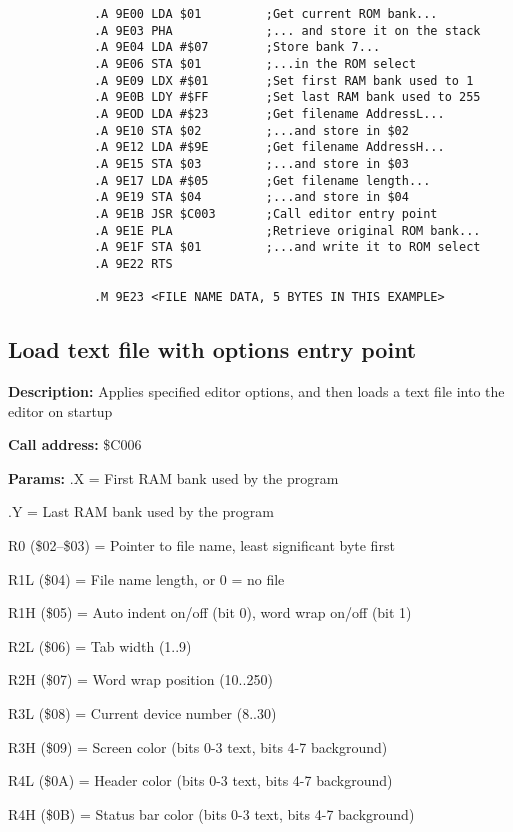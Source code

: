 \documentclass{article}
\begin{document}
        \begin{verbatim}
            .A 9E00 LDA $01         ;Get current ROM bank...
            .A 9E03 PHA             ;... and store it on the stack
            .A 9E04 LDA #$07        ;Store bank 7...
            .A 9E06 STA $01         ;...in the ROM select
            .A 9E09 LDX #$01        ;Set first RAM bank used to 1
            .A 9E0B LDY #$FF        ;Set last RAM bank used to 255
            .A 9EOD LDA #$23        ;Get filename AddressL...
            .A 9E10 STA $02         ;...and store in $02
            .A 9E12 LDA #$9E        ;Get filename AddressH...
            .A 9E15 STA $03         ;...and store in $03
            .A 9E17 LDA #$05        ;Get filename length...
            .A 9E19 STA $04         ;...and store in $04
            .A 9E1B JSR $C003       ;Call editor entry point
            .A 9E1E PLA             ;Retrieve original ROM bank...
            .A 9E1F STA $01         ;...and write it to ROM select
            .A 9E22 RTS

            .M 9E23 <FILE NAME DATA, 5 BYTES IN THIS EXAMPLE>
        \end{verbatim}    

\subsection{Load text file with options entry point}

        \begin{hangparas}{3cm}{1}

            \textbf{Description:} \tabto{3cm} Applies specified editor options, and then loads a text file into the editor on startup

            \textbf{Call address:} \tabto{3cm}\$C006

            \textbf{Params:} \tabto{3cm}.X = First RAM bank used by the program
        
            \tabto{3cm} .Y = Last RAM bank used by the program

            \tabto{3cm} R0 (\$02--\$03) = Pointer to file name, least significant byte first

            \tabto{3cm} R1L (\$04) = File name length, or 0 = no file

            \tabto{3cm} R1H (\$05) = Auto indent on/off (bit 0), word wrap on/off (bit 1)

            \tabto{3cm} R2L (\$06) = Tab width (1..9)

            \tabto{3cm} R2H (\$07) = Word wrap position (10..250)

            \tabto{3cm} R3L (\$08) = Current device number (8..30)

            \tabto{3cm} R3H (\$09) = Screen color (bits 0-3 text, bits 4-7 background)

            \tabto{3cm} R4L (\$0A) = Header color (bits 0-3 text, bits 4-7 background)

            \tabto{3cm} R4H (\$0B) = Status bar color (bits 0-3 text, bits 4-7 background)

        \end{hangparas}
\end{document}

